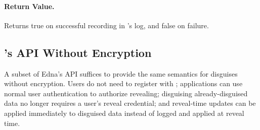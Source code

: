     \paragraph{Return Value.} Returns true on successful recording in \sys's
    log, and false on failure.

\subsection{\sys's API Without Encryption}
\label{s:noencrypt-api}
A subset of Edna's API suffices to provide the same semantics for disguises
without encryption. Users do not need to register with \sys; applications can
use normal user authentication to authorize revealing; disguising
already-disguised data no longer requires a user's reveal credential; and
reveal-time updates can be applied immediately to disguised data instead of
logged and applied at reveal time.

